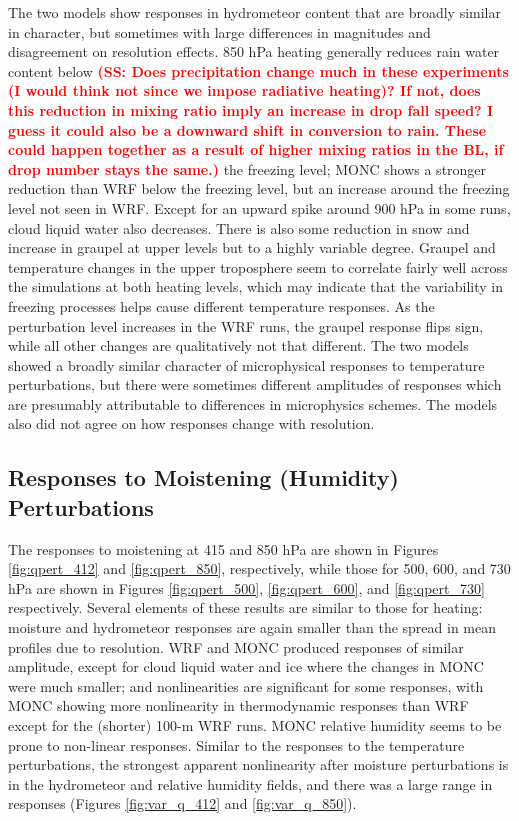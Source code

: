 \documentclass[draft]{agujournal2019}
\newcommand{\todo}[1]{\textcolor{red}{\textbf{(#1)}}}
\begin{document}
The two models show responses in hydrometeor content that are broadly similar in
character, but sometimes with large differences in magnitudes and disagreement
on resolution effects. 850 hPa heating generally reduces rain water content
below \todo{SS: Does precipitation change much in these experiments (I would
think not since we impose radiative heating)?  If not, does this reduction in
mixing ratio imply an increase in drop fall speed?  I guess it could also be a
downward shift in conversion to rain.  These could happen together as a result
of higher mixing ratios in the BL, if drop number stays the same.} the freezing
level; MONC shows a stronger reduction than WRF below the freezing level, but an
increase around the freezing level not seen in WRF. Except for an upward spike
around 900 hPa in some runs, cloud liquid water also decreases. There is also
some reduction in snow and increase in graupel at upper levels but to a highly
variable degree. Graupel and temperature changes in the upper troposphere seem
to correlate fairly well across the simulations at both heating levels, which
may indicate that the variability in freezing processes helps cause different
temperature responses. As the perturbation level increases in the WRF runs, the
graupel response flips sign, while all other changes are qualitatively not that
different. The two models showed a broadly similar character of microphysical
responses to temperature perturbations, but there were sometimes different
amplitudes of responses which are presumably attributable to differences in
microphysics schemes. The models also did not agree on how responses change with
resolution.

\subsection{Responses to Moistening (Humidity) Perturbations}

The responses to moistening at 415 and 850 hPa are shown in Figures
\ref{fig:qpert_412} and \ref{fig:qpert_850}, respectively, while those for 500,
600, and 730 hPa are shown in Figures \ref{fig:qpert_500}, \ref{fig:qpert_600},
and \ref{fig:qpert_730} respectively. Several elements of these results are
similar to those for heating: moisture and hydrometeor responses are again
smaller than the spread in mean profiles due to resolution. WRF and MONC
produced responses of similar amplitude, except for cloud liquid water and ice
where the changes in MONC were much smaller; and nonlinearities are significant
for some responses, with MONC showing more nonlinearity in thermodynamic
responses than WRF except for the (shorter) 100-m WRF runs. MONC relative
humidity seems to be prone to non-linear responses. Similar to the responses to
the temperature perturbations, the strongest apparent nonlinearity after
moisture perturbations is in the hydrometeor and relative humidity fields, and
there was a large range in responses (Figures \ref{fig:var_q_412} and
\ref{fig:var_q_850}).
\end{document}
